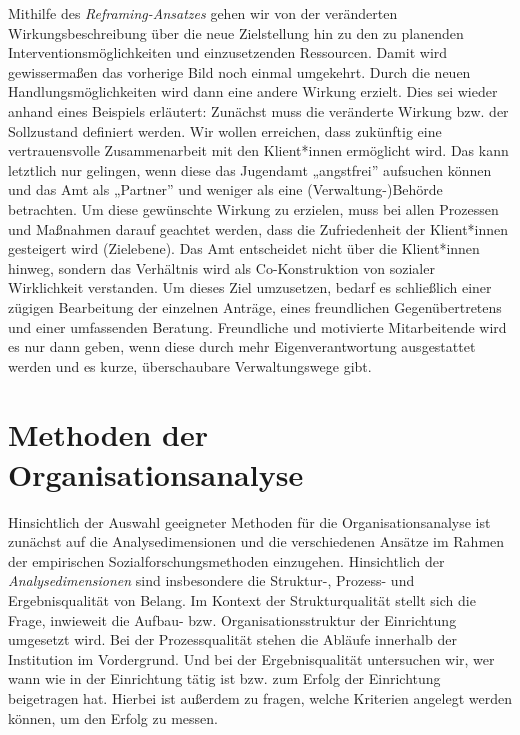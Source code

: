 \documentclass[
  letterpaper,
]{book}
\begin{document}
Mithilfe des \emph{Reframing-Ansatzes} gehen wir von der veränderten
Wirkungsbeschreibung über die neue Zielstellung hin zu den zu planenden
Interventionsmöglichkeiten und einzusetzenden Ressourcen. Damit wird
gewissermaßen das vorherige Bild noch einmal umgekehrt. Durch die neuen
Handlungsmöglichkeiten wird dann eine andere Wirkung erzielt. Dies sei
wieder anhand eines Beispiels erläutert: Zunächst muss die veränderte
Wirkung bzw. der Sollzustand definiert werden. Wir wollen erreichen,
dass zukünftig eine vertrauensvolle Zusammenarbeit mit den Klient*innen
ermöglicht wird. Das kann letztlich nur gelingen, wenn diese das
Jugendamt „angstfrei'' aufsuchen können und das Amt als „Partner'' und
weniger als eine (Verwaltung-)Behörde betrachten. Um diese gewünschte
Wirkung zu erzielen, muss bei allen Prozessen und Maßnahmen darauf
geachtet werden, dass die Zufriedenheit der Klient*innen gesteigert wird
(Zielebene). Das Amt entscheidet nicht über die Klient*innen hinweg,
sondern das Verhältnis wird als Co-Konstruktion von sozialer
Wirklichkeit verstanden. Um dieses Ziel umzusetzen, bedarf es
schließlich einer zügigen Bearbeitung der einzelnen Anträge, eines
freundlichen Gegenübertretens und einer umfassenden Beratung.
Freundliche und motivierte Mitarbeitende wird es nur dann geben, wenn
diese durch mehr Eigenverantwortung ausgestattet werden und es kurze,
überschaubare Verwaltungswege gibt.

\section{Methoden der
Organisationsanalyse}\label{methoden-der-organisationsanalyse}

Hinsichtlich der Auswahl geeigneter Methoden für die
Organisationsanalyse ist zunächst auf die Analysedimensionen und die
verschiedenen Ansätze im Rahmen der empirischen Sozialforschungsmethoden
einzugehen. Hinsichtlich der \emph{Analysedimensionen} sind insbesondere
die Struktur-, Prozess- und Ergebnisqualität von Belang. Im Kontext der
Strukturqualität stellt sich die Frage, inwieweit die Aufbau- bzw.
Organisationsstruktur der Einrichtung umgesetzt wird. Bei der
Prozessqualität stehen die Abläufe innerhalb der Institution im
Vordergrund. Und bei der Ergebnisqualität untersuchen wir, wer wann wie
in der Einrichtung tätig ist bzw. zum Erfolg der Einrichtung beigetragen
hat. Hierbei ist außerdem zu fragen, welche Kriterien angelegt werden
können, um den Erfolg zu messen.
\end{document}
